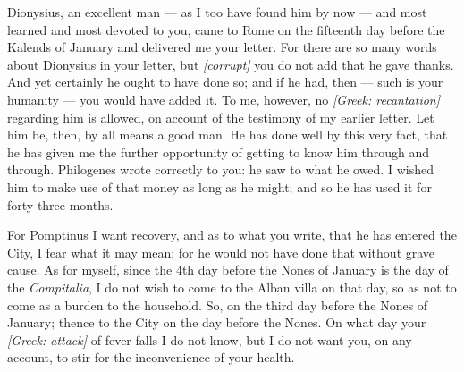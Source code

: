 

 Dionysius, an excellent man --- as I too have found him by now --- and most learned and most devoted to you, came to Rome on the fifteenth day before the Kalends of January and delivered me your letter. For there are so many words about Dionysius in your letter, but \textit{[corrupt]} you do not add that he gave thanks. And yet certainly he ought to have done so; and if he had, then --- such is your humanity --- you would have added it. To me, however, no \textit{[Greek: recantation]} regarding him is allowed, on account of the testimony of my earlier letter. Let him be, then, by all means a good man. He has done well by this very fact, that he has given me the further opportunity of getting to know him through and through. Philogenes wrote correctly to you: he saw to what he owed. I wished him to make use of that money as long as he might; and so he has used it for forty-three months.

 For Pomptinus I want recovery, and as to what you write, that he has entered the City, I fear what it may mean; for he would not have done that without grave cause. As for myself, since the 4th day before the Nones of January is the day of the \textit{Compitalia}, I do not wish to come to the Alban villa on that day, so as not to come as a burden to the household. So, on the third day before the Nones of January; thence to the City on the day before the Nones. On what day your \textit{[Greek: attack]} of fever falls I do not know, but I do not want you, on any account, to stir for the inconvenience of your health.

